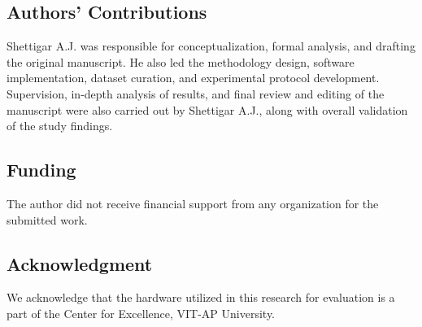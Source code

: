 \documentclass[a4paper,fleqn]{cas-dc}
\numberwithin{equation}{section}
\begin{document}
\subsection*{Authors' Contributions}
Shettigar A.J. was responsible for conceptualization, formal analysis, and drafting the original manuscript. He also led the methodology design, software implementation, dataset curation, and experimental protocol development. Supervision, in-depth analysis of results, and final review and editing of the manuscript were also carried out by Shettigar A.J., along with overall validation of the study findings.

\subsection*{Funding}
The author did not receive financial support from any organization for the submitted work.

\subsection*{Acknowledgment}
We acknowledge that the hardware utilized in this research for evaluation is a part of the Center for Excellence, VIT-AP University.



\end{document}

